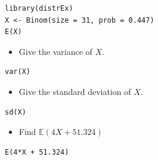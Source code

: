 \documentclass[captions=tableheading]{scrbook}
\begin{document}
\begin{xca}
\begin{verbatim}
library(distrEx)
X <- Binom(size = 31, prob = 0.447)
E(X)
\end{verbatim}
\begin{itemize}
\item Give the variance of \(X\).
\end{itemize}

\begin{verbatim}
var(X)
\end{verbatim}
\begin{itemize}
\item Give the standard deviation of \(X\).
\end{itemize}

\begin{verbatim}
sd(X)
\end{verbatim}
\begin{itemize}
\item Find \(\mathbb{E}(4X+51.324)\)
\end{itemize}

\begin{verbatim}
E(4*X + 51.324)
\end{verbatim}

\end{xca}
\end{document}
